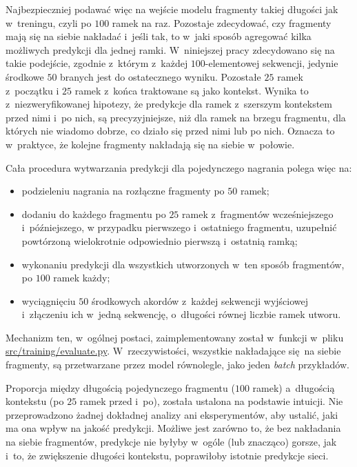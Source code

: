 Najbezpieczniej podawać więc na wejście modelu fragmenty takiej długości jak w~treningu, czyli po $100$ ramek na raz. Pozostaje zdecydować, czy fragmenty mają się na siebie nakładać i~jeśli tak, to w~jaki sposób agregować kilka możliwych predykcji dla jednej ramki. W~niniejszej pracy zdecydowano się na takie podejście, zgodnie z~którym z~każdej $100$-elementowej sekwencji, jedynie środkowe $50$ branych jest do ostatecznego wyniku. Pozostałe $25$ ramek z~początku i $25$ ramek z~końca traktowane są jako kontekst. Wynika to z~niezweryfikowanej hipotezy, że predykcje dla ramek z~szerszym kontekstem przed nimi i~po nich, są precyzyjniejsze, niż dla ramek na brzegu fragmentu, dla których nie wiadomo dobrze, co działo się przed nimi lub po nich. Oznacza to w~praktyce, że kolejne fragmenty nakładają się na siebie w~połowie. 

Cała procedura wytwarzania predykcji dla pojedynczego nagrania polega więc na:
\begin{itemize}
    \item podzieleniu nagrania na rozłączne fragmenty po $50$ ramek;
    \item dodaniu do każdego fragmentu po $25$ ramek z~fragmentów wcześniejszego i~późniejszego, w
        przypadku pierwszego i~ostatniego fragmentu, uzupełnić powtórzoną wielokrotnie odpowiednio
        pierwszą i~ostatnią ramką;
    \item wykonaniu predykcji dla wszystkich utworzonych w~ten sposób fragmentów, po $100$ ramek
        każdy;
    \item wyciągnięciu $50$ środkowych akordów z~każdej sekwencji wyjściowej i~złączeniu ich w~jedną
        sekwencję, o~długości równej liczbie ramek utworu.
\end{itemize}
Mechanizm ten, w~ogólnej postaci, zaimplementowany został w~funkcji  w~pliku \url{src/training/evaluate.py}. W~rzeczywistości, wszystkie nakładające się na siebie fragmenty, są przetwarzane przez model równolegle, jako jeden \emph{batch} przykładów.

Proporcja między długością pojedynczego fragmentu ($100$ ramek) a~długością kontekstu (po $25$ ramek przed i~po), została ustalona na podstawie intuicji. Nie przeprowadzono żadnej dokładnej analizy ani eksperymentów, aby ustalić, jaki ma ona wpływ na jakość predykcji. Możliwe jest zarówno to, że bez nakładania na siebie fragmentów, predykcje nie byłyby w~ogóle (lub znacząco) gorsze, jak i~to, że zwiększenie długości kontekstu, poprawiłoby istotnie predykcje sieci.



